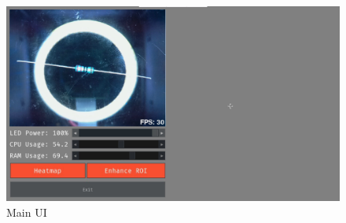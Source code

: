 \begin{figure}
  \begin{minipage}[t]{0.45\textwidth}
    \centering
    \includegraphics[width=\textwidth]{imgs/software/realvnc.jpg}
    \caption{Main UI}
  \end{minipage}
  \hfill
\end{figure}







